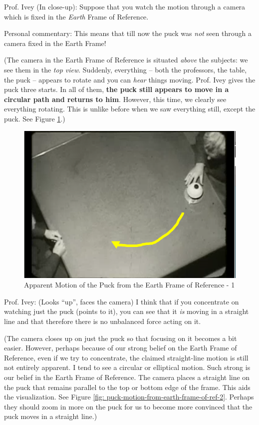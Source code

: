 \documentclass[a6paper]{article}
\newcommand{\perscom}[1]{
    {\footnotesize Personal commentary:  #1}
}
\begin{document}
Prof. Ivey (In close-up): Suppose that you watch the motion through a camera which is fixed in the \emph{Earth} Frame of Reference.

\perscom{ This means that till now the puck was \emph{not} seen through a camera fixed in the Earth Frame! }

(The camera in the Earth Frame of Reference is situated \emph{above} the subjects: we see them in the \emph{top view}. Suddenly, everything -- both the professors, the table, the puck -- appears to rotate and you can \emph{hear} things moving. Prof. Ivey gives the puck three starts. In all of them, \textbf{the puck still appears to move in a circular path and returns to him}. However, this time, we clearly see everything rotating. This is unlike before when we saw everything still, except the puck. See Figure \ref{fig: puck-motion-from-earth-frame-of-ref}.)
        \begin{figure}[h!]
            \centering
            \includegraphics[width=0.5\linewidth]{puck-motion-from-earth-frame-of-reference.png}
            \caption{Apparent Motion of the Puck from the Earth Frame of Reference - 1}
            \label{fig: puck-motion-from-earth-frame-of-ref}
        \end{figure}

Prof. Ivey: (Looks ``up'', faces the camera) I think that if you concentrate on watching just the puck (points to it), you can see that it \emph{is} moving in a straight line and that therefore there is no unbalanced force acting on it.

(The camera closes up on just the puck so that focusing on it becomes a bit easier. However, perhaps because of our strong belief on the Earth Frame of Reference, even if we try to concentrate, the claimed straight-line motion is still not entirely apparent. I tend to see a circular or elliptical motion. Such strong is our belief in the Earth Frame of Reference. The camera places a straight line on the puck that remains parallel to the top or bottom edge of the frame. This aids the visualization. See Figure \ref{fig: puck-motion-from-earth-frame-of-ref-2}. Perhaps they should zoom in more on the puck for us to become more convinced that the puck moves in a straight line.)
\end{document}
